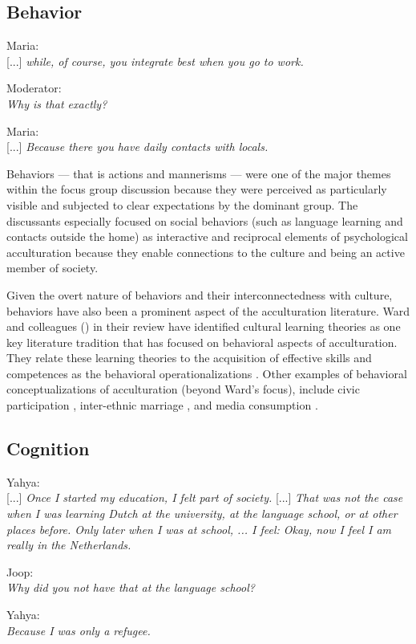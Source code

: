 \documentclass[man, 12pt, a4paper]{apa7}
\begin{document}
\subsection{Behavior}
\begin{displayquote}
    Maria:\\
    {[...]} \textit{while, of course, you integrate best when you go to work.}
    
    Moderator:\\
    \textit{Why is that exactly?}
    
    Maria:\\
    {[...]} \textit{Because there you have daily contacts with locals.}
\end{displayquote}

Behaviors --- that is actions and mannerisms --- were one of the major themes within the focus group discussion because they were perceived as particularly visible and subjected to clear expectations by the dominant group. The discussants especially focused on social behaviors (such as language learning and contacts outside the home) as interactive and reciprocal elements of psychological acculturation because they enable connections to the culture and being an active member of society.

Given the overt nature of behaviors and their interconnectedness with culture, behaviors have also been a prominent aspect of the acculturation literature. Ward and colleagues (\citeyear{Ward2019}) in their review have identified cultural learning theories as one key literature tradition that has focused on behavioral aspects of acculturation. They relate these learning theories to the acquisition of effective skills and competences as the behavioral operationalizations \citep[including, verbal and non-verbal communication skills][]{Ward2001}. Other examples of behavioral conceptualizations of acculturation (beyond Ward's focus), include civic participation \citep[e.g., voting;][]{Lessard-Phillips2020}, inter-ethnic marriage \citep[e.g.,][]{Song2009}, and media consumption \citep[e.g.,][]{Shoemaker1985}. 

\subsection{Cognition}
\begin{displayquote}
    Yahya:\\
    {[...]} \textit{Once I started my education, I felt part of society.} {[...]} \textit{That was not the case when I was learning Dutch at the university, at the language school, or at other places before. Only later when I was at school, ... I feel: Okay, now I feel I am really in the Netherlands.}
    
    Joop:\\
    \textit{Why did you not have that at the language school?}
    
    Yahya:\\
    \textit{Because I was only a refugee.}
\end{displayquote}
\end{document}
